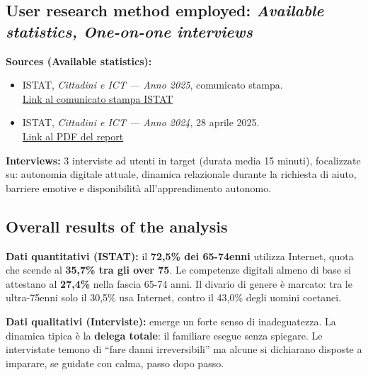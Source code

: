 ﻿\documentclass[11pt,a4paper]{article}
\begin{document}
\subsection*{User research method employed: \textit{Available statistics, One-on-one interviews}}
\begin{tcolorbox}[base]
\textbf{Sources (Available statistics):}
\begin{itemize}[leftmargin=*]
  \item ISTAT, \textit{Cittadini e ICT --- Anno 2025}, comunicato stampa.\\
  \href{https://www.istat.it/comunicato-stampa/cittadini-e-ict-anno-2025/}{Link al comunicato stampa ISTAT}
  \item ISTAT, \textit{Cittadini e ICT --- Anno 2024}, 28 aprile 2025.\\
  \href{https://www.istat.it/wp-content/uploads/2025/04/REPORT_CITTADINI-E-ICT_2024.pdf}{Link al PDF del report}
\end{itemize}

\vspace{0.3cm}
\textbf{Interviews:} 3 interviste ad utenti in target (durata media
15 minuti), focalizzate su: autonomia digitale attuale, dinamica
relazionale durante la richiesta di aiuto, barriere emotive e
disponibilità all'apprendimento autonomo.
\end{tcolorbox}

\subsection*{Overall results of the analysis}
\begin{tcolorbox}[base]
\textbf{Dati quantitativi (ISTAT):} il \textbf{72,5\% dei 65-74enni}
utilizza Internet, quota che scende al \textbf{35,7\% tra gli over 75}.
Le competenze digitali almeno di base si attestano al \textbf{27,4\%}
nella fascia 65-74 anni. Il divario di genere è marcato: tra le
ultra-75enni solo il 30,5\% usa Internet, contro il 43,0\% degli
uomini coetanei.

\vspace{0.2cm}
\textbf{Dati qualitativi (Interviste):} emerge un forte senso di
inadeguatezza. La dinamica tipica è la \textbf{delega totale}: il
familiare esegue senza spiegare. Le intervistate temono di ``fare
danni irreversibili'' ma alcune si dichiarano disposte a imparare,
se guidate con calma, passo dopo passo.
\end{tcolorbox}
\end{document}
